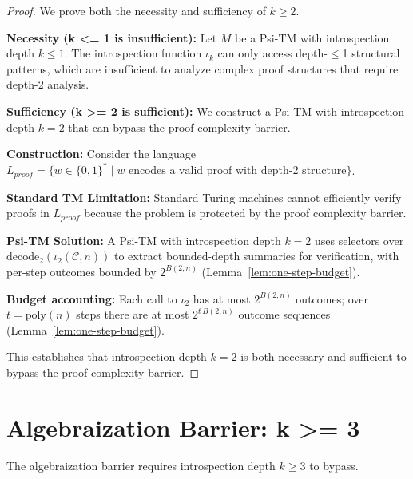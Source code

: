 \begin{proof}
We prove both the necessity and sufficiency of $k \geq 2$.

\textbf{Necessity (k <= 1 is insufficient):}
Let $M$ be a Psi-TM with introspection depth $k \leq 1$. The introspection function $\iota_k$ can only access depth-$\leq$1 structural patterns, which are insufficient to analyze complex proof structures that require depth-2 analysis.

\textbf{Sufficiency (k >= 2 is sufficient):}
We construct a Psi-TM with introspection depth $k = 2$ that can bypass the proof complexity barrier.

\textbf{Construction:}
Consider the language $L_{proof} = \{w \in \{0,1\}^* \mid w \text{ encodes a valid proof with depth-2 structure}\}$.

\textbf{Standard TM Limitation:}
Standard Turing machines cannot efficiently verify proofs in $L_{proof}$ because the problem is protected by the proof complexity barrier.

\textbf{Psi-TM Solution:}
A Psi-TM with introspection depth $k = 2$ uses selectors over $\mathrm{decode}_2(\iota_2(\mathcal{C},n))$ to extract bounded-depth summaries for verification, with per-step outcomes bounded by $2^{B(2,n)}$ (Lemma~\ref{lem:one-step-budget}).

\textbf{Budget accounting:}
Each call to $\iota_2$ has at most $2^{B(2,n)}$ outcomes; over $t=\mathrm{poly}(n)$ steps there are at most $2^{t\,B(2,n)}$ outcome sequences (Lemma~\ref{lem:one-step-budget}).

This establishes that introspection depth $k = 2$ is both necessary and sufficient to bypass the proof complexity barrier.
\end{proof}

\section{Algebraization Barrier: k >= 3}

\begin{theorem}
The algebraization barrier requires introspection depth $k \geq 3$ to bypass.
\end{theorem}

